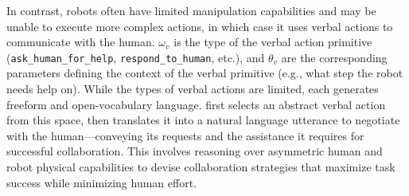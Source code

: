 In contrast, robots often have limited manipulation capabilities and may be unable to execute more complex actions, in which case it uses verbal actions to communicate with the human.
$\omega_v$ is the type of the verbal action primitive (\texttt{ask\_human\_for\_help}, \texttt{respond\_to\_human}, etc.), and $\theta_v$ are the corresponding parameters defining the context of the verbal primitive (e.g., what step the robot needs help on).
While the types of verbal actions are limited, each generates freeform and open-vocabulary language. 
\methodname{} first selects an abstract verbal action from this space, then translates it into a natural language utterance to negotiate with the human—conveying its requests and the assistance it requires for successful collaboration. This involves reasoning over asymmetric human and robot physical capabilities to devise collaboration strategies that maximize task success while minimizing human effort.


